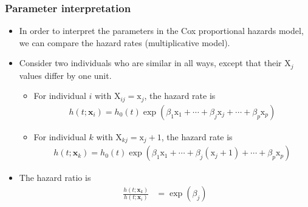 \documentclass{beamer}
\begin{document}
\begin{frame}
\frametitle{Parameter interpretation}
\begin{itemize}
\item In order to interpret the parameters in the Cox proportional hazards model, we can compare the hazard rates (multiplicative model). 
\item Consider two individuals who are similar in all ways, except that their $\mathrm{X}_j$ values differ by one unit. 
\begin{itemize}
\vp \vp
\item For individual $i$ with  $\mathrm{X}_{ij}=\mathrm{x}_j$, the hazard rate is  
\begin{align*}
h(t; \mathbf{x}_i) = h_0(t) \exp(\beta_1 \mathrm{x}_1 + \cdots + \beta_j \mathrm{x}_j+\cdots + \beta_p \mathrm{x}_p)
\end{align*}
\item For individual $k$ with $\mathrm{X}_{kj}=\mathrm{x}_j+1$, the hazard rate is 
\begin{align*}
h(t; \mathbf{x}_k) = h_0(t) \exp(\beta_1 \mathrm{x}_1 + \cdots + \beta_j (\mathrm{x}_j+1)+\cdots + \beta_p \mathrm{x}_p)
\end{align*}
\end{itemize}
\item The \alert{hazard ratio} is
\begin{align*}
\frac{h(t; \mathbf{x}_k)}{h(t; \mathbf{x}_i)} &= 
 \exp(\beta_j)
\end{align*}
\end{itemize}
\end{frame}
\end{document}
